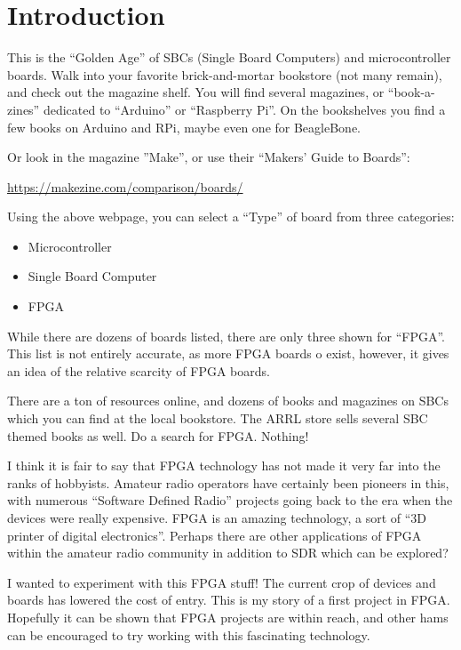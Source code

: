 \section{Introduction}

This is the ``Golden Age'' of SBCs (Single Board Computers) and microcontroller boards.
Walk into your favorite brick-and-mortar bookstore (not many remain), 
and check out the magazine shelf.  You will find several magazines, or ``book-a-zines''
dedicated to ``Arduino'' or ``Raspberry Pi''.  On the bookshelves you find a few books on Arduino and RPi, maybe even one for BeagleBone.

Or look in the magazine ''Make'', or use their ``Makers’ Guide to Boards'':

\url{https://makezine.com/comparison/boards/}

Using the above webpage, you can select a ``Type'' of board from three categories:

\begin{itemize}
	\item Microcontroller
	\item Single Board Computer
	\item FPGA
\end{itemize}

While there are dozens of boards listed, there are only three shown for ``FPGA''.
This list is not entirely accurate, as more FPGA boards o exist, however, it gives
an idea of the relative scarcity of FPGA boards.

There are a ton of resources online, and dozens of books and magazines on SBCs which you can find at the local bookstore.
The ARRL store sells several SBC themed books as well.  Do a search for FPGA.  Nothing!

I think it is fair to say that FPGA technology has not made it very far into the ranks of hobbyists.
Amateur radio operators have certainly been pioneers in this, with numerous ``Software Defined Radio''
projects going back to the era when the devices were really expensive.  FPGA is an amazing technology, a sort of ``3D printer of digital electronics''.  Perhaps there are other applications of FPGA within the amateur radio community in addition to SDR which can be explored?

I wanted to experiment with this FPGA stuff! The current crop of devices and boards has lowered the cost of entry.  This is my story of a first project in FPGA.  Hopefully it can be shown that FPGA projects are within reach, and other hams can be encouraged to try working with this fascinating technology.


